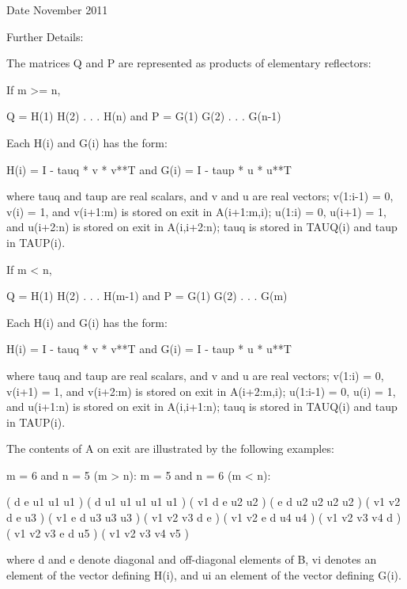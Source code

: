 \begin{DoxyDate}{Date}
November 2011 
\end{DoxyDate}
\begin{DoxyParagraph}{Further Details\+: }
\begin{DoxyVerb}  The matrices Q and P are represented as products of elementary
  reflectors:

  If m >= n,

     Q = H(1) H(2) . . . H(n)  and  P = G(1) G(2) . . . G(n-1)

  Each H(i) and G(i) has the form:

     H(i) = I - tauq * v * v**T  and G(i) = I - taup * u * u**T

  where tauq and taup are real scalars, and v and u are real vectors;
  v(1:i-1) = 0, v(i) = 1, and v(i+1:m) is stored on exit in A(i+1:m,i);
  u(1:i) = 0, u(i+1) = 1, and u(i+2:n) is stored on exit in A(i,i+2:n);
  tauq is stored in TAUQ(i) and taup in TAUP(i).

  If m < n,

     Q = H(1) H(2) . . . H(m-1)  and  P = G(1) G(2) . . . G(m)

  Each H(i) and G(i) has the form:

     H(i) = I - tauq * v * v**T  and G(i) = I - taup * u * u**T

  where tauq and taup are real scalars, and v and u are real vectors;
  v(1:i) = 0, v(i+1) = 1, and v(i+2:m) is stored on exit in A(i+2:m,i);
  u(1:i-1) = 0, u(i) = 1, and u(i+1:n) is stored on exit in A(i,i+1:n);
  tauq is stored in TAUQ(i) and taup in TAUP(i).

  The contents of A on exit are illustrated by the following examples:

  m = 6 and n = 5 (m > n):          m = 5 and n = 6 (m < n):

    (  d   e   u1  u1  u1 )           (  d   u1  u1  u1  u1  u1 )
    (  v1  d   e   u2  u2 )           (  e   d   u2  u2  u2  u2 )
    (  v1  v2  d   e   u3 )           (  v1  e   d   u3  u3  u3 )
    (  v1  v2  v3  d   e  )           (  v1  v2  e   d   u4  u4 )
    (  v1  v2  v3  v4  d  )           (  v1  v2  v3  e   d   u5 )
    (  v1  v2  v3  v4  v5 )

  where d and e denote diagonal and off-diagonal elements of B, vi
  denotes an element of the vector defining H(i), and ui an element of
  the vector defining G(i).\end{DoxyVerb}
 
\end{DoxyParagraph}
\hypertarget{group__realGEcomputational_ga89f21d7700aaccc5fc72ca3316c33463}{}
